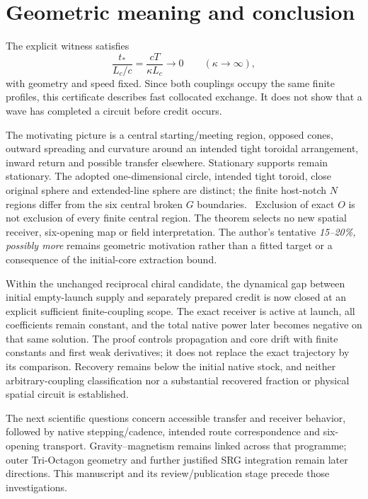\section{Geometric meaning and conclusion}\label{sec:conclusion}
The explicit witness satisfies
\begin{equation}\label{eq:traveltime}
\frac{t_*}{L_c/c}=\frac{cT}{\kappa L_c}\longrightarrow0
\qquad(\kappa\to\infty),
\end{equation}
with geometry and speed fixed. Since both couplings occupy the same finite profiles, this certificate describes fast collocated exchange. It does not show that a wave has completed a circuit before credit occurs.

The motivating picture is a central starting/meeting region, opposed cones, outward spreading and curvature around an intended tight toroidal arrangement, inward return and possible transfer elsewhere. Stationary supports remain stationary. The adopted one-dimensional circle, intended tight toroid, close original sphere and extended-line sphere are distinct; the finite host-notch $N$ regions differ from the six central broken $G$ boundaries.~\cite[Section 8]{baseline} Exclusion of exact $O$ is not exclusion of every finite central region. The theorem selects no new spatial receiver, six-opening map or field interpretation. The author's tentative \emph{15--20\%, possibly more} remains geometric motivation rather than a fitted target or a consequence of the initial-core extraction bound.

Within the unchanged reciprocal chiral candidate, the dynamical gap between initial empty-launch supply and separately prepared credit is now closed at an explicit sufficient finite-coupling scope. The exact receiver is active at launch, all coefficients remain constant, and the total native power later becomes negative on that same solution. The proof controls propagation and core drift with finite constants and first weak derivatives; it does not replace the exact trajectory by its comparison. Recovery remains below the initial native stock, and neither arbitrary-coupling classification nor a substantial recovered fraction or physical spatial circuit is established.

The next scientific questions concern accessible transfer and receiver behavior, followed by native stepping/cadence, intended route correspondence and six-opening transport. Gravity--magnetism remains linked across that programme; outer Tri-Octagon geometry and further justified SRG integration remain later directions. This manuscript and its review/publication stage precede those investigations.

